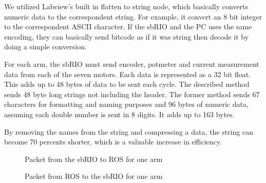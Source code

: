 We utilized Labview's built in flatten to string node, which basically converts numeric data to the correspondent string. For example, it convert an 8 bit integer to the correspondent ASCII character. If the sbRIO and the PC uses the same encoding, they can basically send bitcode as if it was string then decode it by doing a simple conversion.
 

For each arm, the sbRIO must send encoder, potmeter and current measurement data from each of the seven motors. Each data is represented as a 32 bit float. This adds up to 48 bytes of data to be sent each cycle. The described method sends 48 byte long strings not including the header. The former method sends 67 characters for formatting and naming purposes and 96 bytes of numeric data, assuming each double number is sent in 8 digits. It adds up to 163 bytes.

By removing the names from the string and compressing a data, the string can become 70 percents shorter, which is a valuable increase in efficiency.

\begin{figure}[H]
\centering
{}
\caption{Packet from the sbRIO to ROS for one arm}
\label{received_packet}
\end{figure}

\begin{figure}[H]
\centering
{}
\caption{Packet from ROS to the sbRIO for one arm}
\label{sent_packet}
\end{figure}

